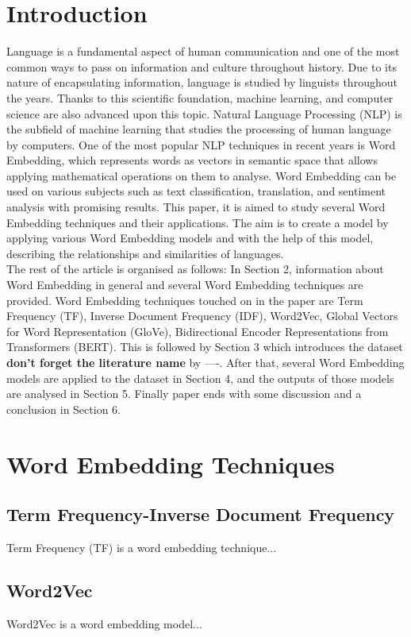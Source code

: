 \documentclass[man]{apa7}
\begin{document}
\section{Introduction}
Language is a fundamental aspect of human communication and one of the most common ways to pass on information and culture throughout history. Due to its nature of encapsulating information, language is studied by linguists throughout the years. Thanks to this scientific foundation, machine learning, and computer science are also advanced upon this topic. Natural Language Processing (NLP) is the subfield of machine learning that studies the processing of human language by computers. One of the most popular NLP techniques in recent years is Word Embedding, which represents words as vectors in semantic space that allows applying mathematical operations on them to analyse. Word Embedding can be used on various subjects such as text classification, translation, and sentiment analysis with promising results. This paper, it is aimed to study several Word Embedding techniques and their applications. The aim is to create a model by applying various Word Embedding models and with the help of this model, describing the relationships and similarities of languages.\\
The rest of the article is organised as follows: In Section 2, information about Word Embedding in general and several Word Embedding techniques are provided. Word Embedding techniques touched on in the paper are Term Frequency (TF), Inverse Document Frequency (IDF), Word2Vec, Global Vectors for Word Representation (GloVe), Bidirectional Encoder Representations from Transformers (BERT). This is followed by Section 3 which introduces the dataset {\large \textbf{don't forget the literature name}} by ----. After that, several Word Embedding models are applied to the dataset in Section 4, and the outputs of those models are analysed in Section 5. Finally paper ends with some discussion and a conclusion in Section 6.

\section{Word Embedding Techniques}
\lipsum[0-1]
\subsection{Term Frequency-Inverse Document Frequency}
Term Frequency (TF) is a word embedding technique...
\subsection{Word2Vec}
Word2Vec is a word embedding model...
\end{document}
